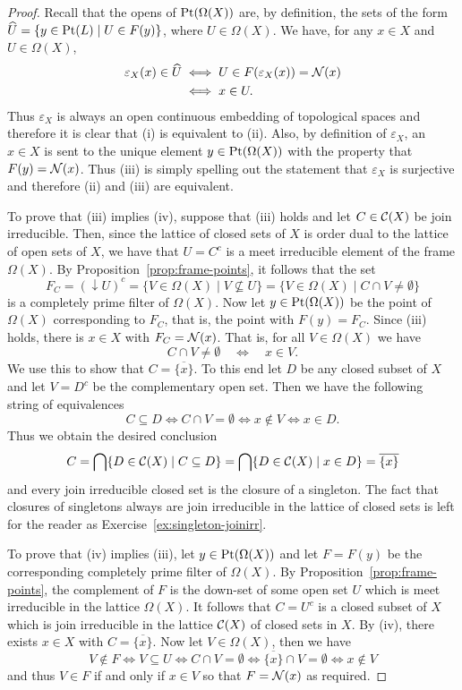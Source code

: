 \begin{proof}
Recall that the opens of $\mathrm{Pt}(\Omega(X))$ are, by definition, the sets of the form $\widehat{U}=\{y\in\mathrm{Pt}(L)\mid U\in F(y)\}$, where $U \in \Omega(X)$. We have, for any $x \in X$ and $U \in \Omega(X)$,
\begin{align*}
\varepsilon_X(x)\in \widehat{U} & \iff U\in F(\varepsilon_X(x))=\mathcal{N}(x)\\
						& \iff x\in U.
\end{align*}
Thus $\varepsilon_X$ is always an open continuous embedding of topological spaces and therefore it is clear that (i) is equivalent to (ii). Also, by definition of $\varepsilon_X$, an $x\in X$ is sent to the unique element $y\in\mathrm{Pt}(\Omega(X))$ with the property that $F(y)=\mathcal{N}(x)$. Thus (iii) is simply spelling out the statement that $\varepsilon_X$ is surjective and therefore (ii) and (iii) are equivalent.

To prove that (iii) implies (iv), suppose that (iii) holds and let $C\in\mathcal{C}(X)$ be join irreducible. Then, since the lattice of closed sets of $X$ is order dual to the lattice of open sets of $X$, we have that $U=C^c$ is a meet irreducible element of the frame $\Omega(X)$. By Proposition~\ref{prop:frame-points}, it follows that the set
\[
F_C=({\downarrow}U)^c=\{V\in\Omega(X)\mid V\not\subseteq U\}=\{V\in\Omega(X)\mid C\cap V\neq \emptyset\}
\]
is a completely prime filter of $\Omega(X)$. Now let $y\in\mathrm{Pt}(\Omega(X))$ be the point of $\Omega(X)$ corresponding to $F_C$, that is, the point with $F(y)=F_C$. Since (iii) holds, there is $x\in X$ with $F_C=\mathcal{N}(x)$. That is, for all $V\in\Omega(X)$ we have
\[
C\cap V\neq \emptyset \quad\iff\quad x\in V.
\]
We use this to show that $C=\overline{\{x\}}$. To this end let $D$ be any closed subset of $X$ and let $V=D^c$ be the complementary open set. Then we have the following string of equivalences
\[
C\subseteq D\iff C\cap V=\emptyset \iff x\not\in V \iff x\in D.
\]
Thus we obtain the desired conclusion
\[
C=\bigcap\{D\in\mathcal{C}(X)\mid C\subseteq D\}=\bigcap\{D\in\mathcal{C}(X)\mid x\in D\}=\overline{\{x\}}
\]
and every join irreducible closed set is the closure of a singleton. The fact that closures of singletons always are join irreducible in the lattice of closed sets is left for the reader as Exercise~\ref{ex:singleton-joinirr}. 

To prove that (iv) implies (iii), let $y\in\mathrm{Pt}(\Omega(X))$ and let $F=F(y)$ be the corresponding completely prime filter of $\Omega(X)$. By Proposition~\ref{prop:frame-points}, the complement of $F$ is the down-set of some open set $U$ which is meet irreducible in the lattice $\Omega(X)$. It follows that $C=U^c$ is a closed subset of $X$ which is join irreducible in the lattice $\mathcal{C}(X)$ of closed sets in $X$. By (iv), there exists $x\in X$ with $C=\overline{\{x\}}$. Now let $V\in\Omega(X)$, then we have
\[
V\not\in F \iff V\subseteq U\iff C\cap V=\emptyset \iff \overline{\{x\}}\cap V=\emptyset \iff x\not\in V
\]
and thus $V\in F$ if and only if $x\in V$ so that $F=\mathcal{N}(x)$ as required.
\end{proof}

